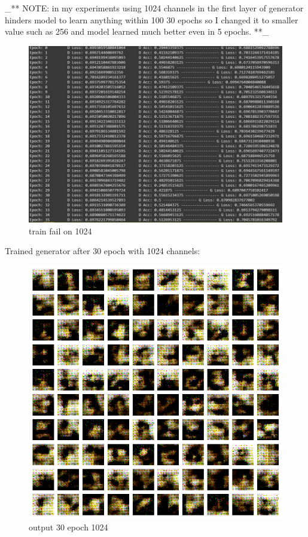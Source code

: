 \documentclass[11pt]{article}
\makeatletter
\def\maxwidth{\ifdim\Gin@nat@width>\linewidth\linewidth
    \else\Gin@nat@width\fi}
\let\Oldincludegraphics\includegraphics
\renewcommand{\includegraphics}[1]{\Oldincludegraphics[width=.8\maxwidth]{#1}}
\makeatother
\begin{document}
    \_** NOTE: in my experiments using 1024 channels in the first layer of
generator hinders model to learn anything within 100 30 epochs so I
changed it to smaller value such as 256 and model learned much better
even in 5 epochs. **\_

\begin{figure}
\centering
\includegraphics{wiki/3_2.jpg}
\caption{train fail on 1024}
\end{figure}

Trained generator after 30 epoch with 1024 channels:

\begin{figure}
\centering
\includegraphics{wiki/3_3.png}
\caption{output 30 epoch 1024}
\end{figure}
\end{document}
